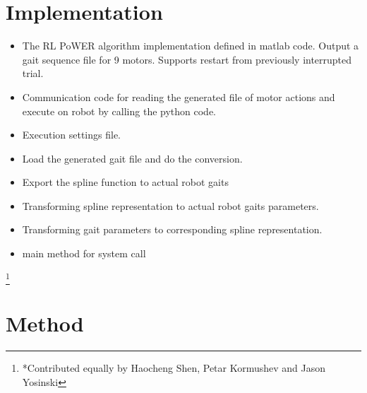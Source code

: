\section{Implementation}
\begin{itemize}
\item {} The RL PoWER algorithm implementation defined in matlab code. Output a gait sequence file for 9 motors. Supports restart from previously interrupted trial. 
\item {} Communication code for reading the generated file of motor actions and execute on robot by calling the python code. 
\item {} Execution settings file. 
\item {} Load the generated gait file and do the conversion.
\item {} Export the spline function to actual robot gaits
\item {} Transforming spline representation to actual robot gaits parameters.
\item {} Transforming gait parameters to corresponding spline representation.
\item {} main method for system call
\end{itemize}

\footnote{*Contributed equally by Haocheng Shen, Petar Kormushev and Jason Yosinski}



\section{Method}

